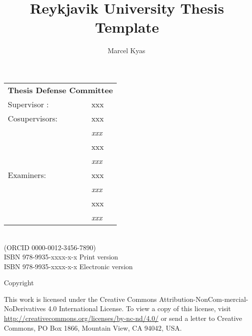 \documentclass[b5paper,10pt]{ruthesis2}
\begin{document}
\title{Reykjavik University Thesis Template}
\author{Marcel Kyas\,}
\date{}

\thispagestyle{title}
\maketitle
\clearpage

\thispagestyle{empty}

\begin{flushleft}
  \begin{tabular}{ll}
    \multicolumn{2}{l}{\textbf{Thesis Defense Committee}}
    \\[.5em]
    Supervisor : & xxx\\[.5em]
    Cosupervisors: & xxx \\
    & \quad\textit{xxx} \\[.5em]
    & xxx \\
    & \quad\textit{xxx} \\[.5em]
    Examiners: & xxx \\
    & \quad\textit{xxx}\\[.5em]
    & xxx \\
    & \quad\textit{xxx}\\[.5em]
  \end{tabular}
\end{flushleft}


\vfill
\begin{flushleft}
  {\thetitle} \\[\baselineskip]
  {\theauthor} (ORCID 0000-0012-3456-7890)\\[\baselineskip]

  ISBN 978-9935-xxxx-x-x Print version\\
  ISBN 978-9935-xxxx-x-x Electronic version\\
\end{flushleft}

\bigskip\noindent Copyright \textcopyright{} \the\year{} \ccbyncnd

\begingroup\bigskip\noindent 
This work is licensed under the Creative Commons Attribution-NonCom-\linebreak mercial-NoDerivatives 4.0 International License.
To view a copy of this license, visit \href{http://creativecommons.org/licenses/by-nc-nd/4.0/}{http://creativecommons.org/licenses/by-nc-nd/4.0/} or send a letter to Creative Commons, PO Box 1866, Mountain View, CA 94042, USA.
\end{document}
